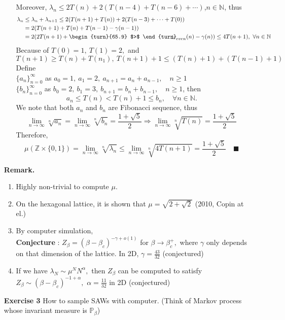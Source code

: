 \documentclass[12pt,a4paper]{report}
\theoremstyle{definition}
\newcommand{\indecate}{\mbox{\begin{turn}{65.9}
$>$
\end{turn}\hspace{-10.5pt}\parbox[t][-5pt][c]{10pt}{$\bot$}\hspace{-4.35pt}\parbox[t][-3.4pt][c]{4pt}{$\shortmid$}}}
\begin{document}
\begin{enumerate}
\begin{enumerate}
		Moreover, $\lambda_n\leq 2T(n)+2(T(n-4)+T(n-6)+\cdots )$,\quad $n\in\mathbb{N}$, thus
		\begin{align*}
		    \lambda_n&\leq\lambda_n+\lambda_{n+1}\leq 2(T(n+1)+T(n))+2(T(n-3)+\cdots +T(0))\\
		    &=2(T(n+1)+T(n)+T(n-1)-\gamma(n-1))\\
		    &=2(2T(n+1)+\indecate_{even}(n)-\gamma(n))\leq 4T(n+1),\ \forall n\in\mathbb{N}
		\end{align*}
		Because of $T(0)=1,\ T(1)=2,$ and 
		\[ 
		T(n+1)\geq T(n)+T(n_1),\ T(n+1)+1\leq (T(n)+1)+(T(n-1)+1)
		\]
		Define\\
		$\{a_n\}_{n=0}^\infty$ as $a_0=1,\ a_1=2,\ a_{n+1}=a_n+a_{n-1},\quad n\geq 1$\\
		$\{b_n\}_{n=0}^\infty$ as $b_0=2,\ b_1=3,\ b_{n+1}=b_n+b_{n-1},\quad n\geq 1$, then 
		\[
		a_n\leq T(n)<T(n)+1\leq b_n,\quad \forall n\in\mathbb{N}.
		\]
		We note that both $a_n$ and $b_n$ are Fibonacci sequence, thus
		\[
		\lim_{n\to\infty}\sqrt[n]{a_n}=\lim_{n\to\infty}\sqrt[n]{b_n}=\frac{1+\sqrt{5}}{2}\Rightarrow \lim_{n\to\infty}\sqrt[n]{T(n)}=\frac{1+\sqrt{5}}{2}
		\]
		Therefore,
		\[
		\mu(\mathbb{Z}\times \{0,1\})=\lim_{n\to\infty}\sqrt[n]{\lambda_n}\leq \lim_{n\to\infty}\sqrt[n]{4T(n+1)}=\frac{1+\sqrt{5}}{2}\quad \blacksquare
		\]
	\end{enumerate}
	\item[\textbf{Remark.}] \begin{enumerate}
		\item Highly non-trivial to compute $\mu.$
		\item On the hexagonal lattice, it is shown that $\mu=\sqrt{2+\sqrt{2}}$ (2010, Copin at el.)
		\item By computer simulation,\\
		\textbf{Conjecture} : $Z_\beta=(\beta-\beta_c)^{-\gamma+o(1)}$ for $\beta\to \beta_c^+,$ where $\gamma$ only depends on that dimension of the lattice. In 2D, $\gamma=\frac{43}{32}$ (conjectured)
		\item If we have $\lambda_N\sim \mu^NN^\alpha ,$ then $Z_\beta$ can be computed to satisfy $Z_\beta\sim (\beta-\beta_c)^{-1+\alpha},$ $\alpha=\frac{11}{32}$ in 2D (conjectured) 
	\end{enumerate}
	\item[\textbf{Exercise 3}] How to sample SAWs with computer. (Think of Markov process whose invariant measure is $\mathbb{P}_\beta$)
\end{enumerate}
\newpage
\end{document}

